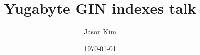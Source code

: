 \documentclass{beamer}
\title{Yugabyte GIN indexes talk}
\author{Jason Kim}
\date{\today}
\institute{}
\begin{document}
\begin{frame}
  \titlepage
  \hypertarget{titlePage}{}
\end{frame}
\end{document}
